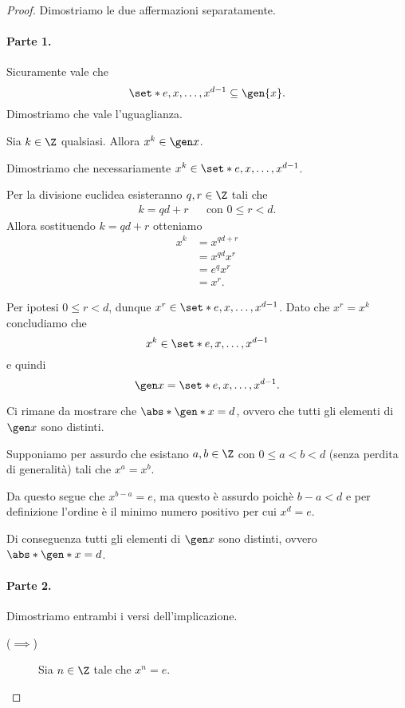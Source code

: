 \begin{proof}
    Dimostriamo le due affermazioni separatamente. 
    
    \paragraph{Parte 1.} Sicuramente vale che \[
        \set*{e, x, \dots, x^{d-1}} \subseteq \gen{x}.    
    \] Dimostriamo che vale l'uguaglianza.

    Sia $k \in \Z$ qualsiasi. Allora $x^k \in \gen x$. 
    
    Dimostriamo che necessariamente $x^k \in \set*{e, x, \dots, x^{d-1}}$.

    Per la divisione euclidea esisteranno $q, r \in \Z$ tali che \begin{align*}
        k = qd + r &&\text{con } 0 \leq r < d.
    \end{align*} Allora sostituendo $k = qd+r$ otteniamo \begin{align*}
        x^k &= x^{qd + r}\\
        &= x^{qd}x^r\\
        &= e^qx^r\\
        &= x^r.
    \end{align*}
    
    Per ipotesi $0 \leq r < d$, dunque $x^r \in \set*{e, x, \dots, x^{d-1}}$. Dato che $x^r = x^k$ concludiamo che \[
        x^k \in \set*{e, x, \dots, x^{d-1}}    
    \] e quindi \[
        \gen x = \set*{e, x, \dots, x^{d-1}}.    
    \]

    Ci rimane da mostrare che $\abs*{\gen* x} = d$, ovvero che tutti gli elementi di $\gen x$ sono distinti. 

    Supponiamo per assurdo che esistano $a, b \in \Z$ con $0 \leq a < b < d$ (senza perdita di generalità) tali che $x^a = x^b$.

    Da questo segue che $x^{b-a} = e$, ma questo è assurdo poichè $b-a < d$ e per definizione l'ordine è il minimo numero positivo per cui $x^d = e$.

    Di conseguenza tutti gli elementi di $\gen x$ sono distinti, ovvero $\abs*{\gen* x} = d$.

    \paragraph{Parte 2.} Dimostriamo entrambi i versi dell'implicazione.
    \begin{description}
        \item[($\implies$)] Sia $n \in \Z$ tale che $x^n = e$.
        

\end{description}
\end{proof}
